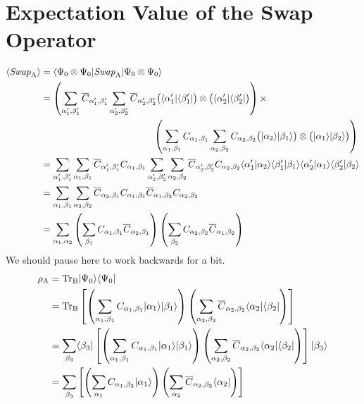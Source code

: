 \chapter{Expectation Value of the Swap Operator}
\label{swaperator}

\begin{align}
\langle \SWA \rangle &=
\bra{\Psi_0\otimes\Psi_0}\SWA \ket{\Psi_0\otimes\Psi_0} \\ &= \nonumber
	\left(\sum_{\alpha'_1,\beta'_1}
		\overline{C}_{\alpha'_1,\beta'_1}\sum_{\alpha'_2,\beta'_2} 
		\overline{C}_{\alpha'_2,\beta'_2}
			\big(\bra{\alpha'_1}\bra{\beta'_1}\big)\otimes\big(\bra{\alpha'_2}\bra{\beta'_2}\big)
			  \right) \times \\ 
	& \hspace{4.2cm}
		\left( \sum_{\alpha_1,\beta_1}C_{\alpha_1,\beta_1}\sum_{\alpha_2,\beta_2} 
			C_{\alpha_2,\beta_2}
			\big(\ket{\alpha_2}\ket{\beta_1}\big)\otimes
			\big(\ket{\alpha_1}\ket{\beta_2}\big) \right) \\
	&=\sum_{\alpha'_1,\beta'_1}\sum_{\alpha_1,\beta_1}
		\overline{C}_{\alpha'_1,\beta'_1}C_{\alpha_1,\beta_1}
		\sum_{\alpha'_2,\beta'_2}\sum_{\alpha_2,\beta_2} 
		\overline{C}_{\alpha'_2,\beta'_2}C_{\alpha_2,\beta_2}
		\inn{\alpha'_1}{\alpha_2}\inn{\beta'_1}{\beta_1}
		\inn{\alpha'_2}{\alpha_1}\inn{\beta'_2}{\beta_2} \\
	&=\sum_{\alpha_1,\beta_1} \sum_{\alpha_2,\beta_2}
		\overline{C}_{\alpha_2,\beta_1}C_{\alpha_1,\beta_1}
		\overline{C}_{\alpha_1,\beta_2}C_{\alpha_2,\beta_2}\\
	&= \sum_{\alpha_1,\alpha_2} \left( \sum_{\beta_1}
		 C_{\alpha_1,\beta_1} \overline{C}_{\alpha_2,\beta_1}\right) 
		 \left( \sum_{\beta_2} C_{\alpha_2,\beta_2} \overline{C}_{\alpha_1,\beta_2}\right)
		\label{mmmm}	
\end{align}
We should pause here to work backwards for a bit.
\begin{align}
	\rho_{\rm A} &= {\rm Tr_B} \lvert {\Psi_0} \rangle \langle {\Psi_0} \rvert \\
	&={\rm Tr_B} \left[ \left(\sum_{\alpha_1,\beta_1} 
		C_{\alpha_1,\beta_1}\lvert {\alpha_1} \rangle\lvert {\beta_1} \rangle\right)
		\left(\sum_{\alpha_2,\beta_2} 
		\overline{C}_{\alpha_2,\beta_2}\langle {\alpha_2} \rvert\langle {\beta_2} \rvert\right) \right] \\
	&=   \sum_{\beta_3} \langle {\beta_3} \rvert \left[ \left(\sum_{\alpha_1,\beta_1} 
		C_{\alpha_1,\beta_1}\lvert {\alpha_1} \rangle\lvert {\beta_1} \rangle\right)
		\left(\sum_{\alpha_2,\beta_2} 
		\overline{C}_{\alpha_2,\beta_2}\langle {\alpha_2} \rvert\langle {\beta_2} \rvert\right) \right] \lvert {\beta_3} \rangle \\
	&=   \sum_{\beta_3}  \left[ \left(\sum_{\alpha_1} 
		C_{\alpha_1,\beta_3}\lvert {\alpha_1} \rangle\right)
		\left(\sum_{\alpha_2} 
		\overline{C}_{\alpha_2,\beta_3}\langle {\alpha_2} \rvert\right) \right] 
\end{align}
